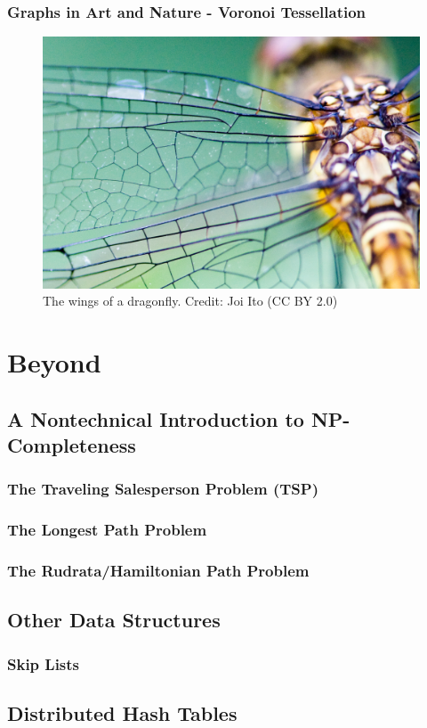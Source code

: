 \documentclass[10pt,a4paper]{book}
\begin{document}
\section{Graphs in Art and Nature - Voronoi Tessellation}

\begin{figure}
	\centering
	\includegraphics[width=0.7\linewidth]{pics/dragonfly_wing_joi_ito}
	\caption{The wings of a dragonfly. Credit: Joi Ito (CC BY 2.0)}
	\label{fig:dragonflywingjoiito}
\end{figure}



\part{Beyond}

\chapter{A Nontechnical Introduction to NP-Completeness}

\section{The Traveling Salesperson Problem (TSP)}
\section{The Longest Path Problem}
\section{The Rudrata/Hamiltonian Path Problem}
\chapter{Other Data Structures}


\section{Skip Lists}


\chapter{Distributed Hash Tables}
\end{document}
